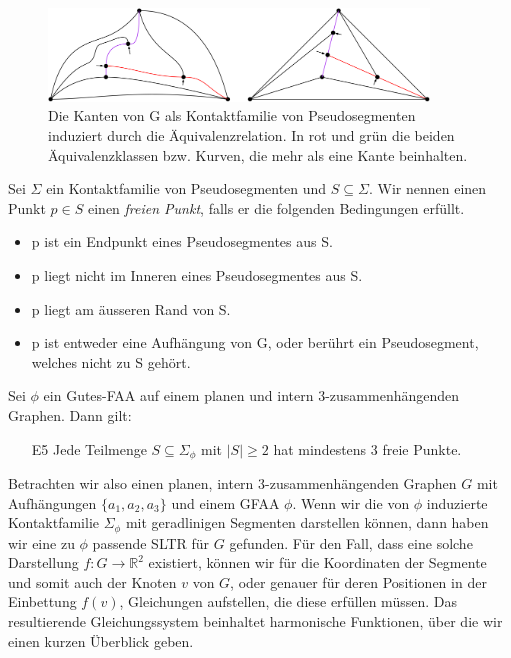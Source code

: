 \begin{figure}[h]
	\centering
  \includegraphics[width=0.9\textwidth]{pseudo_seg.png}
  \caption{Die Kanten von G als Kontaktfamilie von Pseudosegmenten induziert durch die Äquivalenzrelation. In rot und grün die beiden Äquivalenzklassen bzw. Kurven, die mehr als eine Kante beinhalten.}
\end{figure}

\begin{definition}
Sei $\Sigma$ ein Kontaktfamilie von Pseudosegmenten und $S\subseteq\Sigma$. Wir nennen einen Punkt $p\in S$ einen \textit{freien Punkt}, falls er die folgenden Bedingungen erfüllt.
\begin{itemize}
\item p ist ein Endpunkt eines Pseudosegmentes aus S.
\item p liegt nicht im Inneren eines Pseudosegmentes aus S.
\item p liegt am äusseren Rand von S.
\item p ist entweder eine Aufhängung von G, oder berührt ein Pseudosegment, welches nicht zu S gehört.
\end{itemize} 
\end{definition}

\begin{lemma}\cite[Lemma 2.8]{af13}\label{lemma_af13}
Sei $\phi$ ein Gutes-FAA auf einem planen und intern 3-zusammenhängenden Graphen. Dann gilt: 
\begin{itemize}
\item [E5] Jede Teilmenge $S \subseteq \Sigma_{\phi}$ mit $|S| \geq 2$ hat mindestens 3 freie Punkte.
\end{itemize}
\end{lemma}

Betrachten wir also einen planen, intern 3-zusammenhängenden Graphen $G$ mit Aufhängungen $\{a_1,a_2,a_3\}$ und einem GFAA $\phi$. Wenn wir die von $\phi$ induzierte Kontaktfamilie $\Sigma_{\phi}$ mit geradlinigen Segmenten darstellen können, dann haben wir eine zu $\phi$ passende SLTR für $G$ gefunden. Für den Fall, dass eine solche Darstellung $f:G\to\mathbb{R}^2$ existiert, können wir für die Koordinaten der Segmente und somit auch der Knoten $v$ von $G$, oder genauer für deren Positionen in der Einbettung $f(v)$, Gleichungen aufstellen, die diese erfüllen müssen. Das resultierende Gleichungssystem beinhaltet harmonische Funktionen, über die wir einen kurzen Überblick geben. 

